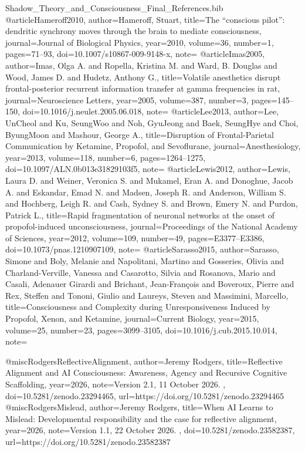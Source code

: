 \begin{filecontents*}[overwrite]{Shadow_Theory_and_Consciousness_Final_References.bib}
@article{Hameroff2010,
 author={Hameroff, Stuart},
 title={The ``conscious pilot'': dendritic synchrony moves through the brain to mediate consciousness},
 journal={Journal of Biological Physics}, year={2010}, volume={36}, number={1}, pages={71--93},
 doi={10.1007/s10867-009-9148-x},
 note={}
}
@article{Imas2005,
 author={Imas, Olga A. and Ropella, Kristina M. and Ward, B. Douglas and Wood, James D. and Hudetz, Anthony G.},
 title={Volatile anesthetics disrupt frontal-posterior recurrent information transfer at gamma frequencies in rat},
 journal={Neuroscience Letters}, year={2005}, volume={387}, number={3}, pages={145--150},
 doi={10.1016/j.neulet.2005.06.018},
 note={}
}
@article{Lee2013,
 author={Lee, UnCheol and Ku, SeungWoo and Noh, GyuJeong and Baek, SeungHye and Choi, ByungMoon and Mashour, George A.},
 title={Disruption of Frontal-Parietal Communication by Ketamine, Propofol, and Sevoflurane},
 journal={Anesthesiology}, year={2013}, volume={118}, number={6}, pages={1264--1275},
 doi={10.1097/ALN.0b013e31829103f5},
 note={}
}
@article{Lewis2012,
 author={Lewis, Laura D. and Weiner, Veronica S. and Mukamel, Eran A. and Donoghue, Jacob A. and Eskandar, Emad N. and Madsen, Joseph R. and Anderson, William S. and Hochberg, Leigh R. and Cash, Sydney S. and Brown, Emery N. and Purdon, Patrick L.},
 title={Rapid fragmentation of neuronal networks at the onset of propofol-induced unconsciousness},
 journal={Proceedings of the National Academy of Sciences}, year={2012}, volume={109}, number={49}, pages={E3377--E3386},
 doi={10.1073/pnas.1210907109},
 note={}
}
@article{Sarasso2015,
 author={Sarasso, Simone and Boly, Melanie and Napolitani, Martino and Gosseries, Olivia and Charland-Verville, Vanessa and Casarotto, Silvia and Rosanova, Mario and Casali, Adenauer Girardi and Brichant, Jean-Fran{\c c}ois and Boveroux, Pierre and Rex, Steffen and Tononi, Giulio and Laureys, Steven and Massimini, Marcello},
 title={Consciousness and Complexity during Unresponsiveness Induced by Propofol, Xenon, and Ketamine},
 journal={Current Biology}, year={2015}, volume={25}, number={23}, pages={3099--3105},
 doi={10.1016/j.cub.2015.10.014},
 note={}
}

@misc{RodgersReflectiveAlignment,
 author={Jeremy Rodgers},
 title={Reflective Alignment and {AI} Consciousness: Awareness, Agency and Recursive Cognitive Scaffolding},
 year={2026},
 note={Version 2.1, 11 October 2026. },
 doi={10.5281/zenodo.23294465},
 url={https://doi.org/10.5281/zenodo.23294465}
}
@misc{RodgersMislead,
 author={Jeremy Rodgers},
 title={When {AI} Learns to Mislead: Developmental responsibility and the case for reflective alignment},
 year={2026},
 note={Version 1.1, 22 October 2026. },
 doi={10.5281/zenodo.23582387},
 url={https://doi.org/10.5281/zenodo.23582387}
}



\end{filecontents*}
